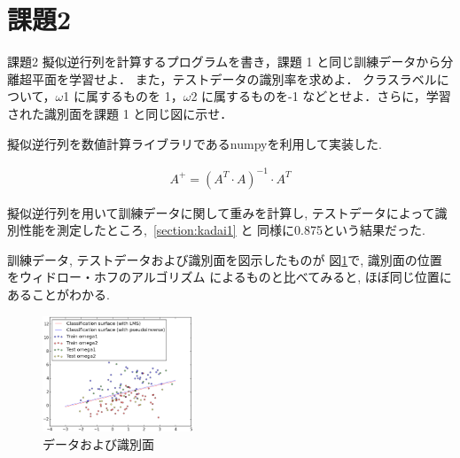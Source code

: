 \section{課題2}\label{section:kadai2}
\begin{itembox}{課題2}
  擬似逆行列を計算するプログラムを書き，課題 1 と同じ訓練データから分離超平面を学習せよ．
  また，テストデータの識別率を求めよ．
  クラスラベルについて，$\omega$1 に属するものを 1，$\omega$2 に属するものを-1 などとせよ．さらに，学習された識別面を課題 1 と同じ図に示せ．
\end{itembox}

擬似逆行列を数値計算ライブラリであるnumpyを利用して実装した. 

\begin{eqnarray*}
  A^{+} = (A^{T} \cdot A)^{-1} \cdot A^{T}
\end{eqnarray*}

擬似逆行列を用いて訓練データに関して重みを計算し, 
テストデータによって識別性能を測定したところ,~\ref{section:kadai1} と
同様に0.875という結果だった. 

訓練データ, テストデータおよび識別面を図示したものが
図\ref{fig:kadai2}で, 識別面の位置をウィドロー・ホフのアルゴリズム
によるものと比べてみると, ほぼ同じ位置にあることがわかる. 

\begin{figure}[htbp]
  \centering
  \includegraphics[width=0.4\textwidth]{./assets/kadai2_plot_20150122_031556.eps}
  \caption{データおよび識別面}
  \label{fig:kadai2}
\end{figure}

